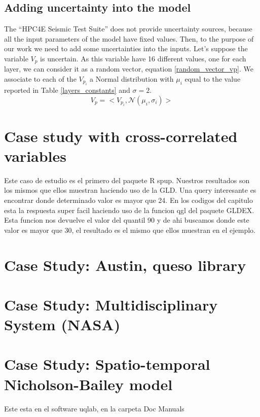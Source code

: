 \subsection{Adding uncertainty into the model}

The “HPC4E Seismic Test Suite” does not provide uncertainty sources, because all the input parameters of the model have fixed values. Then, to the purpose of our work we need to add some uncertainties into the inputs. Let's suppose the variable ${V_{p}}$ is uncertain. As this variable have 16 different values, one for each layer, we can consider it as a random vector, equation \ref{random_vector_vp}. We associate to each of the $V_{{p}_{i}}$ a Normal distribution with ${\mu}_{i}$ equal to the value reported in Table \ref{layers_constants} and $\sigma=2$.
\begin{equation}\label{random_vector_vp}
V_{p}=<V_{{p}_{i}},\mathcal{N}({\mu}_{i},{\sigma}_{i})>
\end{equation}

\section{Case study with cross-correlated variables}
Este caso de estudio es el primero del paquete R spup. Nuestros resultados son los mismos que ellos muestran haciendo uso de la GLD. Una query interesante es encontrar donde determinado valor es mayor que 24. En los codigos del capitulo esta la respuesta super facil haciendo uso de la funcion qgl del paquete GLDEX. Esta funcion nos devuelve el valor del quantil 90 y de ahi buscamos donde este valor es mayor que 30, el resultado es el mismo que ellos muestran en el ejemplo.

\section{Case Study: Austin, queso library}\label{spatio_temporal}

\section{Case Study: Multidisciplinary System (NASA)}\label{NASA}

\section{Case Study: Spatio-temporal Nicholson-Bailey model}
Este esta en el software uqlab, en la carpeta Doc Manuals
